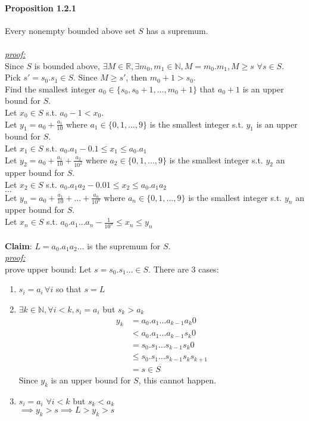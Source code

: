 \documentclass[11pt]{article}
\newcommand{\real}[0]{\mathbb{R}}
\newcommand{\proof}[0]{\textit{\underline{proof:} }}
\begin{document}
\paragraph{Proposition 1.2.1} Every nonempty bounded above set $S$ has a supremum. \\\\
\proof\\
Since $S$ is bounded above, $\exists M \in \real, \exists m_0, m_1 \in \mathbb{N}, M = m_0.m_1, M \geq s \,\, \forall s \in S$.\\
Pick $s' = s_0.s_1 \in S$. Since $M \geq s'$, then $m_0 + 1 > s_0$. \\
Find the smallest integer $a_0 \in \{s_0, s_0 + 1, \hdots, m_0 + 1\}$ that $a_0+ 1$ is an upper bound for $S$. \\
Let $x_0 \in S$ s.t. $a_0 - 1 < x_0$.\\
Let $y_1 = a_0 + \frac{a_1}{10}$ where $a_1 \in \{0,1,\hdots,9\}$ is the smallest integer s.t. $y_1$ is an upper bound for $S$. \\
Let $x_1 \in S$ s.t. $a_0.a_1 - 0.1 \leq x_1 \leq a_0.a_1$\\
Let $y_2 = a_0 + \frac{a_1}{10} + \frac{a_2}{10^2}$ where $a_2 \in \{0,1,\hdots,9\}$ is the smallest integer s.t. $y_2$ an upper bound for $S$. \\
Let $x_2 \in S$ s.t. $a_0.a_1a_2 - 0.01 \leq x_2 \leq a_0.a_1a_2$\\
$\hdots$ \\
Let $y_n = a_0 + \frac{a_1}{10} + \hdots +  \frac{a_n}{10^n}$ where $a_n \in \{0,1,\hdots,9\}$ is the smallest integer s.t. $y_n$ an upper bound for $S$. \\
Let $x_n \in S$ s.t. $a_0.a_1\hdots a_n - \frac{1}{10^n} \leq x_n \leq y_n$\\\\
\textbf{Claim}: $L = a_0.a_1a_2\hdots$ is the supremum for $S$. \\
\proof \\
prove upper bound:
Let $s = s_0.s_1\hdots \in S$. 
There are 3 cases:
\begin{enumerate}
	\item $s_i = a_i \,\forall i$ so that $s = L$
	\item $\exists k \in \mathbb{N}, \forall i < k, s_i = a_i$ but $s_k > a_k$
	\begin{align*}
		y_k &= a_0.a_1\hdots a_{k-1}a_k0\\
		&< a_0.a_1\hdots a_{k-1}s_k0 \\
		&= s_0.s_1\hdots s_{k-1}s_k 0\\
		&\leq s_0.s_1\hdots s_{k-1}s_ks_{k+1}\\
		&= s \in S
	\end{align*}
	Since $y_k$ is an upper bound for $S$, this cannot happen.
	\item $s_i = a_i \,\,\forall i < k$ but $s_k < a_k$\\
	$\implies y_k > s \implies L > y_k> s$
\end{enumerate}
\end{document}
